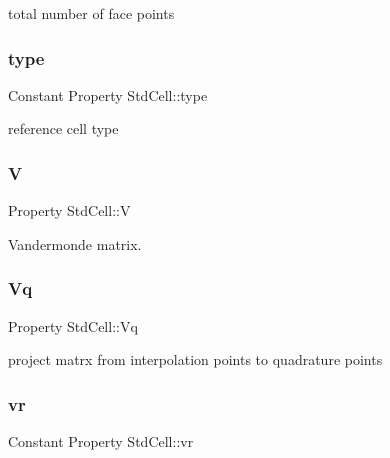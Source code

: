 total number of face points 

\mbox{\label{class_std_cell_a4c1a38abb723d751ade8f70de3635f01}} 
\subsubsection{\texorpdfstring{type}{type}}
{\footnotesize\ttfamily Constant Property Std\+Cell\+::type}



reference cell type 

\mbox{\label{class_std_cell_a042ef905a2ea97d9ef6cf5d5a989d5af}} 
\subsubsection{\texorpdfstring{V}{V}}
{\footnotesize\ttfamily Property Std\+Cell\+::V\hspace{0.3cm}{\ttfamily [protected]}}



Vandermonde matrix. 

\mbox{\label{class_std_cell_a0d754a8782af3ef3f1f8a974145282bf}} 
\subsubsection{\texorpdfstring{Vq}{Vq}}
{\footnotesize\ttfamily Property Std\+Cell\+::\+Vq\hspace{0.3cm}{\ttfamily [protected]}}



project matrx from interpolation points to quadrature points 

\mbox{\label{class_std_cell_a8da4e282eb7aa3d20cac040f3fac3b96}} 
\subsubsection{\texorpdfstring{vr}{vr}}
{\footnotesize\ttfamily Constant Property Std\+Cell\+::vr}



